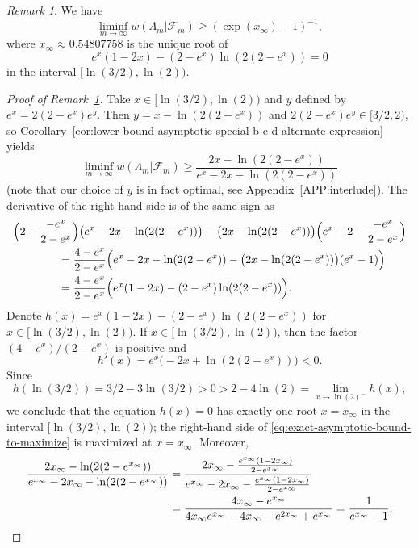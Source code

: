 \documentclass[a4paper]{amsart} %
\theoremstyle{definition}
\theoremstyle{remark}
\newtheorem{remark}[theorem]{Remark}
\numberwithin{equation}{section}
\newcommand*{\LongArxivOrShortJournalVersion}[2]{#1}
\newcommand*{\weakconstrestricted}[2]{w(#1|#2)} %
\newcommand*{\fclassspec}[1]{\mathcal{F}_{#1}}
\newcommand*{\xOptInfty}{x_\infty}
\begin{document}
\begin{remark}
	\label{rem:exact-asymptotic-bound}
	We have 
	\[
	\liminf_{m\to \infty} \weakconstrestricted{\Lambda_m}{\fclassspec{m}}
	\geq (\exp(\xOptInfty) - 1)^{-1},
	\]
	where $\xOptInfty\approx 0.54807758$  %
	is the unique root of
	\[
	e^x (1-2x)  - (2-e^x)\ln(2(2-e^x)) = 0
	\]
	in the interval $[\ln(3/2), \ln(2))$.
\end{remark}

\begin{proof}[Proof of Remark~\ref{rem:exact-asymptotic-bound}]
	Take $x\in [\ln(3/2), \ln(2))$
	and $y$ defined by
	$e^x = 2(2-e^x) e^y$.
	Then $y = x - \ln(2(2-e^x))$ and $2(2-e^x) e^y \in [3/2, 2)$, so  Corollary~\ref{cor:lower-bound-asymptotic-special-b-c-d-alternate-expression} yields
	\begin{equation}
	\label{eq:exact-asymptotic-bound-to-maximize}
	\liminf_{m\to \infty} \weakconstrestricted{\Lambda_m}{\fclassspec{m}}
	\geq 	\frac{2x - \ln(2(2-e^x)) }{e^x - 2x  -\ln(2(2-e^x))}
	\end{equation}
	(note that our choice of $y$ is in fact optimal, see \LongArxivOrShortJournalVersion{Appendix~\ref{APP:interlude}}{Appendix~C in the arXiv version of this paper}).
	The derivative of the right-hand side is of the same sign as 
	\begin{align*}
	\MoveEqLeft[4]
	\Bigl(2-\frac{-e^x}{2-e^x} \Bigr)\bigl(e^x - 2x  -\ln(2(2-e^x))\bigr)
	- \bigl(2x  -\ln(2(2-e^x))\bigr)\Bigl(e^x - 2 -\frac{-e^x}{2-e^x} \Bigr)\\
	&= \frac{4-e^x}{2-e^x}\Bigl( e^x - 2x  -\ln(2(2-e^x)) - \bigl(2x  -\ln(2(2-e^x))\bigr)(e^x -1) \Bigr)\\
	&= \frac{4-e^x}{2-e^x}\Bigl( e^x (1-2x)  - (2-e^x)\ln(2(2-e^x)) \Bigr).
	\end{align*}
	Denote $h(x) = e^x (1-2x)  - (2-e^x)\ln(2(2-e^x))$ for $x\in[\ln(3/2), \ln(2))$.
	If  $x\in[\ln(3/2), \ln(2))$,
	then the factor $(4-e^x)/(2-e^x)$ is positive 
	and
	\[
	h'(x) = e^x\bigl(-2x + \ln(2(2-e^x))\bigr) < 0.
	\]
	Since
	\[
	h(\ln(3/2)) = 3/2 - 3 \ln(3/2) > 0 >  2-4\ln(2) =  \lim_{x\to \ln(2)^-} h(x),
	\]
	we conclude that the equation $h(x) = 0$ has exactly one root $x=\xOptInfty$ in the interval $[\ln(3/2),\ln(2))$;
	the right-hand side of \eqref{eq:exact-asymptotic-bound-to-maximize} is maximized at $x=\xOptInfty$.
	Moreover,
	\begin{align*}
	\frac{2\xOptInfty - \ln(2(2-e^{\xOptInfty})) }{e^{\xOptInfty} - 2\xOptInfty  -\ln(2(2-e^{\xOptInfty}))}
	&=
	\frac{2\xOptInfty - \frac{e^{\xOptInfty}(1-2\xOptInfty)}{2-e^{\xOptInfty}} }{e^{\xOptInfty} - 2\xOptInfty  -  \frac{e^{\xOptInfty}(1-2\xOptInfty)}{2-e^{\xOptInfty}}  }\\
	&=
	\frac{4\xOptInfty - e^{\xOptInfty}}{4\xOptInfty e^{\xOptInfty} - 4 \xOptInfty  - e^{2\xOptInfty} + e^{\xOptInfty} }
	=
	\frac{1}{e^{\xOptInfty} -1}.\qedhere
	\end{align*}
\end{proof}
\end{document}
